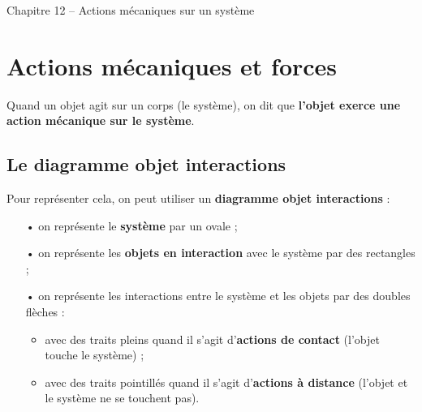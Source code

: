 \documentclass[12pt,a4paper,fleqn]{article}
\begin{document}
\normalem %

\begin{header}
Chapitre 12 -- Actions mécaniques sur un système
\end{header}

\section{Actions mécaniques et forces}

Quand un objet agit sur un corps (le système), on dit que \textbf{l'objet exerce une action mécanique sur le système}.

\subsection{Le diagramme objet interactions}

Pour représenter cela, on peut utiliser un \textbf{diagramme objet interactions} :
\begin{itemize}
\item[•] on représente le \textbf{système} par un ovale ;
\item[•] on représente les \textbf{objets en interaction} avec le système par des rectangles ;
\item[•] on représente les interactions entre le système et les objets par des doubles flèches :
\begin{itemize}
\item avec des traits pleins quand il s'agit d'\textbf{actions de contact} (l'objet touche le système) ;
\item avec des traits pointillés quand il s'agit d'\textbf{actions à distance} (l'objet et le système ne se touchent pas).
\end{itemize} 
\end{itemize}

\begin{center}
\end{center}
\end{document}
